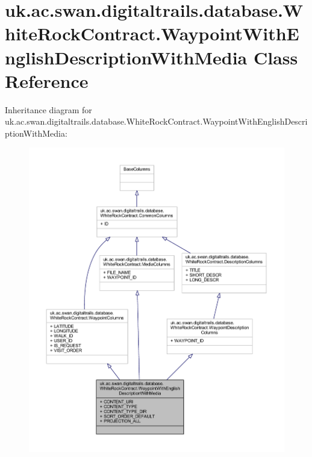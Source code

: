 \hypertarget{classuk_1_1ac_1_1swan_1_1digitaltrails_1_1database_1_1_white_rock_contract_1_1_waypoint_with_english_description_with_media}{\section{uk.\+ac.\+swan.\+digitaltrails.\+database.\+White\+Rock\+Contract.\+Waypoint\+With\+English\+Description\+With\+Media Class Reference}
\label{classuk_1_1ac_1_1swan_1_1digitaltrails_1_1database_1_1_white_rock_contract_1_1_waypoint_with_english_description_with_media}
}


Inheritance diagram for uk.\+ac.\+swan.\+digitaltrails.\+database.\+White\+Rock\+Contract.\+Waypoint\+With\+English\+Description\+With\+Media\+:
\nopagebreak
\begin{figure}[H]
\begin{center}
\leavevmode
\includegraphics[width=350pt]{classuk_1_1ac_1_1swan_1_1digitaltrails_1_1database_1_1_white_rock_contract_1_1_waypoint_with_engb97cf6957f4bfbb8b5c61220be7b504d}
\end{center}
\end{figure}


